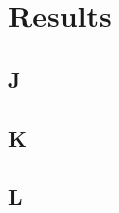 \chapter{Results}\label{ch:results}

\section{J}\label{sec:J}
\lipsum[1-5]

\section{K}\label{sec:K}
\lipsum[1-5]

\section{L}\label{sec:L}
\lipsum[1-5]